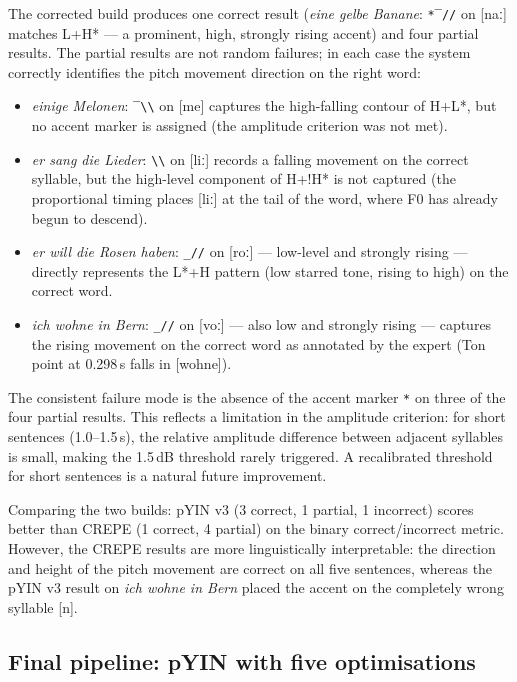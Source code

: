 The corrected build produces one correct result (\textit{eine gelbe Banane}:
\texttt{*‾//} on [naː] matches L+H* — a prominent, high, strongly rising
accent) and four partial results. The partial results are not random failures;
in each case the system correctly identifies the pitch movement direction on the
right word:
\begin{itemize}
\item \textit{einige Melonen}: \texttt{‾\textbackslash\textbackslash} on [me]
      captures the high-falling contour of H+L*, but no accent marker is
      assigned (the amplitude criterion was not met).
\item \textit{er sang die Lieder}: \texttt{\textbackslash\textbackslash} on [liː]
      records a falling movement on the correct syllable, but the high-level
      component of H+!H* is not captured (the proportional timing places [liː]
      at the tail of the word, where F0 has already begun to descend).
\item \textit{er will die Rosen haben}: \texttt{\_//} on [roː] — low-level
      and strongly rising — directly represents the L*+H pattern (low starred
      tone, rising to high) on the correct word.
\item \textit{ich wohne in Bern}: \texttt{\_//} on [voː] — also low and
      strongly rising — captures the rising movement on the correct word as
      annotated by the expert (Ton point at 0.298\,s falls in [wohne]).
\end{itemize}

The consistent failure mode is the absence of the accent marker \texttt{*} on
three of the four partial results. This reflects a limitation in the amplitude
criterion: for short sentences (1.0--1.5\,s), the relative amplitude difference
between adjacent syllables is small, making the 1.5\,dB threshold rarely
triggered. A recalibrated threshold for short sentences is a natural future
improvement.

Comparing the two builds: pYIN v3 (3 correct, 1 partial, 1 incorrect) scores
better than CREPE (1 correct, 4 partial) on the binary correct/incorrect metric.
However, the CREPE results are more linguistically interpretable: the direction
and height of the pitch movement are correct on all five sentences, whereas the
pYIN v3 result on \textit{ich wohne in Bern} placed the accent on the completely
wrong syllable [n\textschwa].

\subsection{Final pipeline: pYIN with five optimisations}
\label{sec:gtobi_pyin_final}

